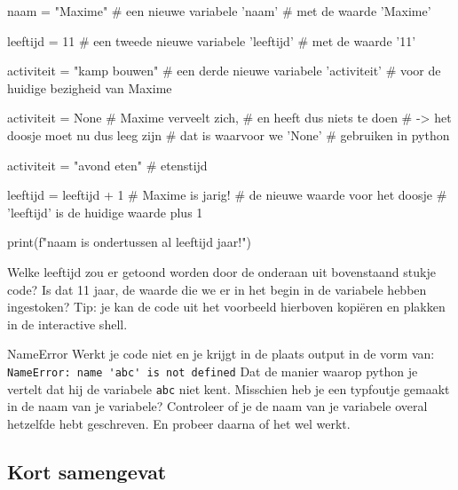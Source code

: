 \begin{pyEnv}
naam = "Maxime"             # een nieuwe variabele 'naam'
                            # met de waarde 'Maxime'

leeftijd = 11               # een tweede nieuwe variabele 'leeftijd'
						    # met de waarde '11'

activiteit = "kamp bouwen"  # een derde nieuwe variabele 'activiteit'
							# voor de huidige bezigheid van Maxime

activiteit = None           # Maxime verveelt zich,
                            # en heeft dus niets te doen
							# -> het doosje moet nu dus leeg zijn
							#    dat is waarvoor we 'None'
							#    gebruiken in python

activiteit = "avond eten"   # etenstijd

leeftijd = leeftijd + 1     # Maxime is jarig!
                            # de nieuwe waarde voor het doosje
							# 'leeftijd' is de huidige waarde plus 1

print(f"{naam} is ondertussen al {leeftijd} jaar!")
\end{pyEnv}

\begin{letsTryOut}
	Welke leeftijd zou er getoond worden door de  onderaan uit bovenstaand stukje code?
	Is dat 11 jaar, de waarde die we er in het begin in de variabele hebben ingestoken?
	\newline
	Tip: je kan de code uit het voorbeeld hierboven kopiëren en plakken in de interactive shell.
\end{letsTryOut}

\begin{firstAidToErrors}{NameError}
	Werkt je code niet en je krijgt in de plaats output in de vorm van:
	\newline
	\verb|NameError: name 'abc' is not defined|
	\newline
	Dat de manier waarop python je vertelt dat hij de variabele \verb|abc| niet kent.
	Misschien heb je een typfoutje gemaakt in de naam van je variabele?
	Controleer of je de naam van je variabele overal hetzelfde hebt geschreven.
	En probeer daarna of het wel werkt.
\end{firstAidToErrors}

\subsection{Kort samengevat}


